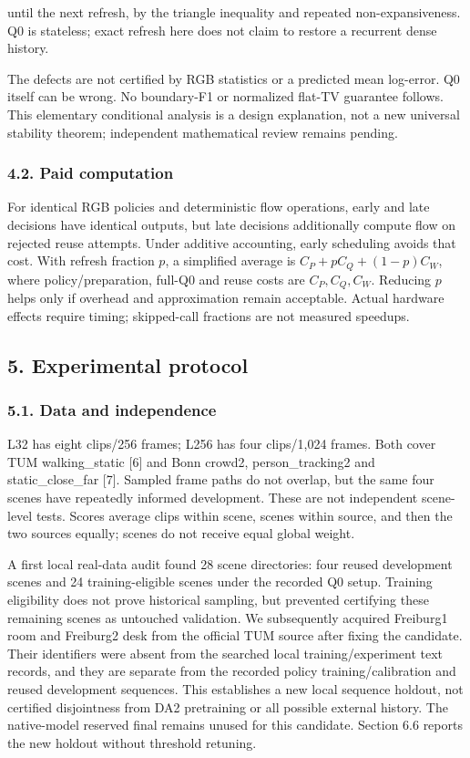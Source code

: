 \documentclass[
  10pt,
]{article}
\begin{document}
until the next refresh, by the triangle inequality and repeated
non-expansiveness. Q0 is stateless; exact refresh here does not claim to
restore a recurrent dense history.

The defects are not certified by RGB statistics or a predicted mean
log-error. Q0 itself can be wrong. No boundary-F1 or normalized flat-TV
guarantee follows. This elementary conditional analysis is a design
explanation, not a new universal stability theorem; independent
mathematical review remains pending.

\subsubsection{4.2. Paid computation}\label{paid-computation}

For identical RGB policies and deterministic flow operations, early and
late decisions have identical outputs, but late decisions additionally
compute flow on rejected reuse attempts. Under additive accounting,
early scheduling avoids that cost. With refresh fraction \(p\), a
simplified average is \(C_P+pC_Q+(1-p)C_W\), where policy/preparation,
full-Q0 and reuse costs are \(C_P,C_Q,C_W\). Reducing \(p\) helps only
if overhead and approximation remain acceptable. Actual hardware effects
require timing; skipped-call fractions are not measured speedups.

\subsection{5. Experimental protocol}\label{experimental-protocol}

\subsubsection{5.1. Data and independence}\label{data-and-independence}

L32 has eight clips/256 frames; L256 has four clips/1,024 frames. Both
cover TUM walking\_static {[}6{]} and Bonn crowd2, person\_tracking2 and
static\_close\_far {[}7{]}. Sampled frame paths do not overlap, but the
same four scenes have repeatedly informed development. These are not
independent scene-level tests. Scores average clips within scene, scenes
within source, and then the two sources equally; scenes do not receive
equal global weight.

A first local real-data audit found 28 scene directories: four reused
development scenes and 24 training-eligible scenes under the recorded Q0
setup. Training eligibility does not prove historical sampling, but
prevented certifying these remaining scenes as untouched validation. We
subsequently acquired Freiburg1 room and Freiburg2 desk from the
official TUM source after fixing the candidate. Their identifiers were
absent from the searched local training/experiment text records, and
they are separate from the recorded policy training/calibration and
reused development sequences. This establishes a new local sequence
holdout, not certified disjointness from DA2 pretraining or all possible
external history. The native-model reserved final remains unused for
this candidate. Section 6.6 reports the new holdout without threshold
retuning.
\end{document}
